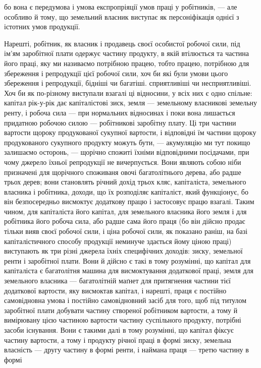 бо вона є передумова і умова експропріяції умов праці у робітників, — але
особливо й тому, що земельний власник виступає як персоніфікація однієї з
істотних умов продукції.

Нарешті, робітник, як власник і продавець своєї особистої робочої сили,
під ім’ям заробітної плати одержує частину продукту, в якій втілюється та
частина його праці, яку ми називаємо потрібною працею, тобто працею, потрібною
для збереження і репродукції цієї робочої сили, хоч би які були умови
цього збереження і репродукції, бідніші чи багатіші. сприятливіші чи несприятливіші.
Хоч би як по-різному виступали взагалі ці відносини, у всіх них є одно
спільне: капітал рік-у-рік дає капіталістові зиск, земля — земельному власникові
земельну ренту, і робоча сила — при нормальних відносинах і поки
вона лишається придатною робочою силою — робітникові заробітну плату.
Ці три частини вартости щороку продукованої сукупної вартости, і відповідні
їм частини щороку продукованого сукупного продукту можуть бути, — акумуляцію
ми тут покищо залишаємо осторонь, — щорічно спожиті їхніми відповідними
посідачами, при чому джерело їхньої репродукції не вичерпується. Вони являють
собою ніби призначені для щорічного споживаня овочі багатолітнього дерева, або
радше трьох дерев; вони становлять річний дохід трьох кляс, капіталіста, земельного
власника і робітника, доходи, що їх розподіляє капіталіст, який функціонує,
бо він безпосередньо висмоктує додаткову працю і застосовує працю взагалі.
Таким чином, для капіталіста його капітал, для земельного власника його земля
і для робітника його робоча сила, або радше сама його праця (бо він дійсно
продає тільки вияв своєї робочої сили, і ціна робочої сили, як показано раніш,
на базі капіталістичного способу продукції неминуче здається йому ціною праці)
виступають як три різні джерела їхніх специфічних доходів: зиску, земельної
ренти і заробітної плати. Вони й дійсно є такі в тому розумінні, що капітал
для капіталіста є багатолітня машина для висмоктування додаткової праці,
земля для земельного власника — багатолітній маґнет для притягнення частини
тієї додаткової вартости, яку висмоктав капітал, і нарешті, праця є постійно
самовідновна умова і постійно самовідновний засіб для того, щоб під титулом
заробітної плати добувати частину створеної робітником вартости, а тому й вимірювану
цією частиною вартости частину суспільного продукту, потрібні засоби
існування. Вони є такими далі в тому розумінні, що капітал фіксує частину
вартости, а тому і продукту річної праці в формі зиску, земельна власність
— другу частину в формі ренти, і наймана праця — третю частину в формі
